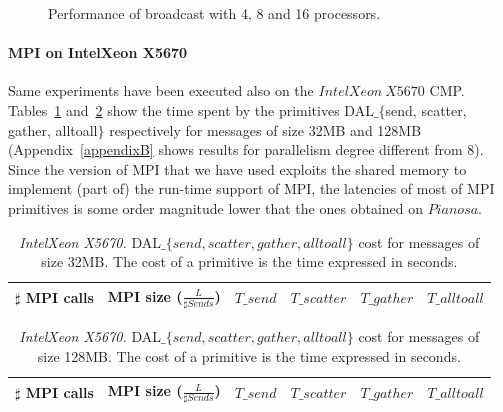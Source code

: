 \begin{figure}[h]
	\caption{Performance of broadcast with 4, 8 and 16 processors.}
	\label{pianosa-mpi-3}
\end{figure}

\clearpage

\paragraph{MPI on IntelXeon X5670}
Same experiments have been executed also on the $IntelXeon\ X5670$ CMP. Tables~\ref{tsetup-xeon-n8-M32} and~\ref{tsetup-xeon-n8-M128} show the time spent by the primitives DAL$\_\lbrace$send, scatter, gather, alltoall$\rbrace$ respectively for messages of size 32MB and 128MB (Appendix~\ref{appendixB} shows results for parallelism degree different from 8). Since the version of MPI that we have used exploits the shared memory to implement (part of) the run-time support of MPI, the latencies of most of MPI primitives is some order magnitude lower that the ones obtained on $Pianosa$.

\begin{table}[h]
\begin{center}
\begin{tabular}{|c|c|c|c|c|c|}\hline
\hline
$\sharp$ MPI calls & MPI size ($\frac{L}{\sharp Sends}$)  & $T\_send$   & $T\_scatter$  & $T\_gather$ & $T\_alltoall$      \\\hline\hline

\end{tabular}
\caption{\textit{IntelXeon X5670.} DAL$\_\lbrace send, scatter, gather, alltoall \rbrace$ cost for messages of size 32MB. The cost of a primitive is the time expressed in seconds. }
\label{tsetup-xeon-n8-M32}
\end{center}
\end{table}

\begin{table}[h]
\begin{center}
\begin{tabular}{|c|c|c|c|c|c|}\hline
\hline
$\sharp$ MPI calls & MPI size ($\frac{L}{\sharp Sends}$)  & $T\_send$   & $T\_scatter$  & $T\_gather$ & $T\_alltoall$      \\\hline\hline

\end{tabular}
\caption{\textit{IntelXeon X5670.} DAL$\_\lbrace send, scatter, gather, alltoall \rbrace$ cost for messages of size 128MB. The cost of a primitive is the time expressed in seconds.}
\label{tsetup-xeon-n8-M128}
\end{center}
\end{table}

